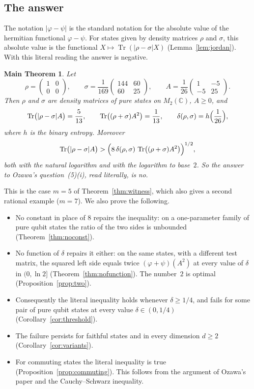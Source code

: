 \documentclass[11pt]{amsart}
\newtheorem*{mainthm}{Main Theorem}
\theoremstyle{definition}\newtheorem{definition}[theorem]{Definition}
\theoremstyle{remark}\newtheorem{remark}[theorem]{Remark}
\DeclareMathOperator{\Tr}{Tr}
\newcommand{\C}{\mathbb{C}}
\newcommand{\abs}[1]{\lvert #1\rvert}
\begin{document}
\subsection{The answer}
The notation \(\abs{\varphi-\psi}\) is the standard notation for the absolute value of the hermitian functional \(\varphi-\psi\). For states given by density matrices \(\rho\) and \(\sigma\), this absolute value is the functional \(X\mapsto\Tr(\abs{\rho-\sigma}X)\) (Lemma~\ref{lem:jordan}). With this literal reading the answer is negative.

\begin{mainthm}
Let
\[
\rho=\begin{pmatrix}1&0\\0&0\end{pmatrix},\qquad
\sigma=\frac{1}{169}\begin{pmatrix}144&60\\60&25\end{pmatrix},\qquad
A=\frac{1}{26}\begin{pmatrix}1&-5\\-5&25\end{pmatrix}.
\]
Then \(\rho\) and \(\sigma\) are density matrices of pure states on \(M_2(\C)\), \(A\ge0\), and
\[
\Tr\bigl(\abs{\rho-\sigma}A\bigr)=\frac{5}{13},\qquad \Tr\bigl((\rho+\sigma)A^2\bigr)=\frac{1}{13},\qquad \delta(\rho,\sigma)=h\Bigl(\frac{1}{26}\Bigr),
\]
where \(h\) is the binary entropy. Moreover
\[
\Tr\bigl(\abs{\rho-\sigma}A\bigr)>\Bigl(8\,\delta(\rho,\sigma)\,\Tr\bigl((\rho+\sigma)A^2\bigr)\Bigr)^{1/2},
\]
both with the natural logarithm and with the logarithm to base~\(2\). So the answer to Ozawa's question~(5)(i), read literally, is no.
\end{mainthm}

This is the case \(m=5\) of Theorem~\ref{thm:witness}, which also gives a second rational example (\(m=7\)). We also prove the following.
\begin{itemize}
\item No constant in place of \(8\) repairs the inequality: on a one-parameter family of pure qubit states the ratio of the two sides is unbounded (Theorem~\ref{thm:noconst}).
\item No function of \(\delta\) repairs it either: on the same states, with a different test matrix, the squared left side equals twice \((\varphi+\psi)(A^2)\) at every value of \(\delta\) in \((0,\ln2]\) (Theorem~\ref{thm:nofunction}). The number~\(2\) is optimal (Proposition~\ref{prop:two}).
\item Consequently the literal inequality holds whenever \(\delta\ge1/4\), and fails for some pair of pure qubit states at every value \(\delta\in(0,1/4)\) (Corollary~\ref{cor:threshold}).
\item The failure persists for faithful states and in every dimension \(d\ge2\) (Corollary~\ref{cor:variants}).
\item For commuting states the literal inequality is true (Proposition~\ref{prop:commuting}). This follows from the argument of Ozawa's paper \cite{ozawa20} and the Cauchy--Schwarz inequality.
\end{itemize}
\end{document}
